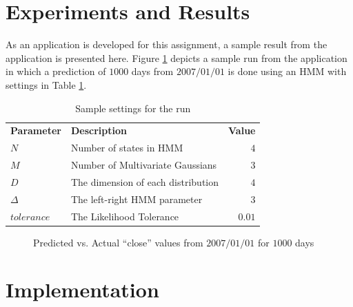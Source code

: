 \documentclass{acm_proc_article-sp}
\newcommand{\thickhline}{\noalign{\hrule height 1.0pt}}
\begin{document}
\section{Experiments and Results} \label{sec:results}
As an application is developed for this assignment, a sample result from the application is presented here. Figure
\ref{fig:res1} depicts a sample run from the application in which a prediction of $1000$ days from $2007/01/01$ is done using
an HMM with settings in Table \ref{tbl:res1}.

\begin{table}[h]
\centering
\begin{tabular}{l l r}  
\textbf{Parameter} & \textbf{Description} & \textbf{Value} \\ \thickhline
$N$ & Number of states in HMM & $4$ \\ \hline
$M$ & Number of Multivariate Gaussians & $3$ \\ \hline
$D$ & The dimension of each distribution & $4$ \\ \hline
$\Delta$ & The left-right HMM parameter & $3$ \\ \hline
$tolerance$ & The Likelihood Tolerance & $0.01$ \\ \hline
\end{tabular}
\caption{Sample settings for the run} \label{tbl:res1}
\end{table}

\begin{figure}[t] 
\centering
\setlength\fboxsep{0.1pt}
\setlength\fboxrule{0.7pt}
\caption{Predicted vs. Actual ``close'' values from $2007/01/01$ for $1000$ days} \label{fig:res1}
\end{figure}

\section{Implementation} \label{sec:impl}
\end{document}
